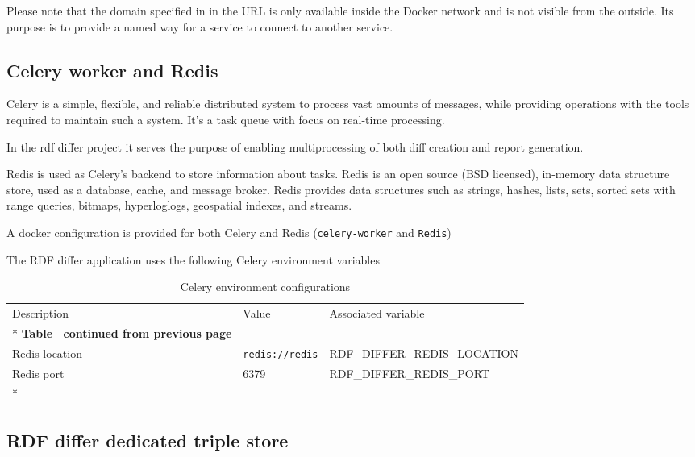 Please note that the domain specified in in the URL is only available inside the Docker network and is not visible from the outside. Its purpose is to provide a named way for a service to connect to another service. 

\subsection{Celery worker and Redis}
Celery is a simple, flexible, and reliable distributed system to process vast amounts of messages, while providing operations with the tools required to maintain such a system. It’s a task queue with focus on real-time processing.

In the rdf differ project it serves the purpose of enabling multiprocessing of both diff creation and report generation.

Redis is used as Celery's backend to store information about tasks.
Redis is an open source (BSD licensed), in-memory data structure store, used as a database, cache, and message broker. Redis provides data structures such as strings, hashes, lists, sets, sorted sets with range queries, bitmaps, hyperloglogs, geospatial indexes, and streams.

A docker configuration is provided for both Celery and Redis (\texttt{celery-worker} and \texttt{Redis})

The RDF differ application uses the following Celery environment variables

\begin{longtable}[c]{@{}p{3.5cm}p{3.5cm}l@{}}
	\toprule
	Description    & Value                  & Associated variable          \\* \midrule
	\endfirsthead
	\multicolumn{3}{c}%
	{{\bfseries Table \thetable\ continued from previous page}}            \\
	\endhead
	\bottomrule
	\endfoot
	\endlastfoot
	Redis location & \texttt{redis://redis} & RDF\_DIFFER\_REDIS\_LOCATION \\
	Redis port     & 6379                   & RDF\_DIFFER\_REDIS\_PORT     \\*\bottomrule
	\caption{Celery environment configurations}
	\label{tab:celery-env}                                                 \\
\end{longtable}
\subsection{RDF differ dedicated triple store}

